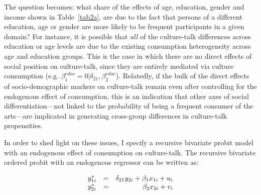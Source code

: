 \documentclass[11pt]{article}
\begin{document}
The question becomes:  what share of the effects of age, education, gender and income shown in Table~\ref{tab2a}, are due to the fact that persons of a different education, age or gender are more likely to be frequent participants in a given domain?  For instance, it is possible that \emph{all} of the culture-talk differences across education or age levels are due to the existing consumption heterogeneity across age and  education groups.  This is the case in which there are no direct effects of social position on culture-talk, since they are entirely mediated via culture consumption (e.g. $\beta_{1}^{educ}=0|\delta_{21}, \beta_{2}^{educ}$).  Relatedly, if the bulk of the direct effects of socio-demographic markers on culture-talk remain even after controlling for the endogenous effect of consumption, this is an indication that other axes of social differentiation---not linked to the probability of being a frequent consumer of the arts---are implicated in generating cross-group differences in culture-talk propensities.

In order to shed light on these issues, I specify a recursive bivariate probit model \citep{greene98} with an endogenous effect of consumption on culture-talk.  The recursive bivariate ordered probit with an endogenous regressor can be written as:

\begin{equation}
        \begin{array}{r r r}
		y^{*}_{1i} &  = & \delta_{21}y_{2i} +\beta_{1} x_{1i} + u_{i} \\ 
		y^{*}_{2i} &  = & \beta_{2} x_{2i} + v_{i} \\
        \end{array}
        \label{eq4}
\end{equation}
\end{document}
